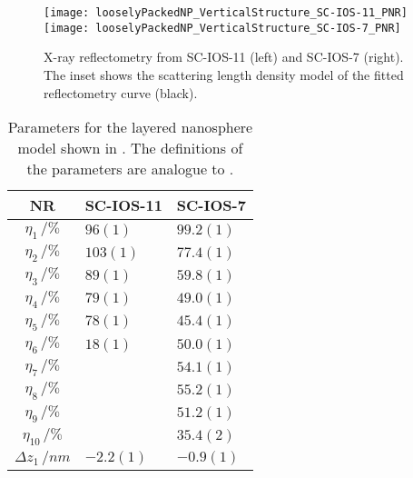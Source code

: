 \documentclass[\main/dresen_thesis.tex]{subfiles}
\begin{document}
  \label{sec:looselyPackedNS:layers:pnr}
  \begin{figure}[tb]
    \centering
    \texttt{[image: looselyPackedNP\_VerticalStructure\_SC-IOS-11\_PNR]}
    \texttt{[image: looselyPackedNP\_VerticalStructure\_SC-IOS-7\_PNR]}
    \caption{\label{fig:looselyPackedNP:layer:xrr}X-ray reflectometry from SC-IOS-11 (left) and SC-IOS-7 (right). The inset shows the scattering length density model of the fitted reflectometry curve (black).}
  \end{figure}

  \begin{table}[!htbp]
    \centering
    \caption{\label{tab:looselyPackedNP:layers:pnr}Parameters for the layered nanosphere model shown in . The definitions of the parameters are analogue to .}
    \begin{tabular}{ c | l | l }
      \rule{0pt}{2ex} \textbf{NR}  & \textbf{SC-IOS-11} & \textbf{SC-IOS-7} \\
      \hline
       $\eta_1     \, / \unit{\%}$                                  & $96(1)$           & $99.2(1)$    \\
       $\eta_2     \, / \unit{\%}$                                  & $103(1)$          & $77.4(1)$    \\
       $\eta_3     \, / \unit{\%}$                                  & $89(1)$           & $59.8(1)$    \\
       $\eta_4     \, / \unit{\%}$                                  & $79(1)$           & $49.0(1)$    \\
       $\eta_5     \, / \unit{\%}$                                  & $78(1)$           & $45.4(1)$    \\
       $\eta_6     \, / \unit{\%}$                                  & $18(1)$           & $50.0(1)$    \\
       $\eta_7     \, / \unit{\%}$                                  &                   & $54.1(1)$    \\
       $\eta_8     \, / \unit{\%}$                                  &                   & $55.2(1)$    \\
       $\eta_9     \, / \unit{\%}$                                  &                   & $51.2(1)$    \\
       $\eta_{10}     \, / \unit{\%}$                               &                   & $35.4(2)$    \\
       \hline
       $\Delta z_1 \, / \unit{nm} $                                 & $-2.2(1)$        & $-0.9(1)$ \\

\end{tabular}
\end{table}
\end{document}
